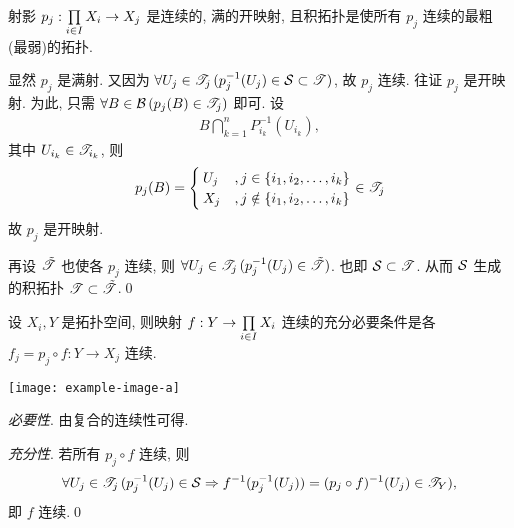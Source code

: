     \begin{Theorem}
        射影 $ p_{j}:\Prod{i\in I}{}X_{i}\to X_{j} $ 是连续的, 满的开映射, 且积拓扑是使所有 $ p_{j} $ 连续的最粗(最弱)的拓扑.
    \end{Theorem}
    \begin{Proof}
        显然 $ p_{j} $ 是满射. 又因为 $ \forall U_{j}\in\ST_{j}\,(p_{j}^{-1}(U_{j})\in\CS\subset\ST) $, 故 $ p_{j} $ 连续. 往证 $ p_{j} $ 是开映射. 为此, 只需 $ \forall B\in\CB\,(p_{j}(B)\in\ST_{j}) $ 即可. 设
        \begin{align*}
            B\bigcap_{k=1}^{n}P_{i_{k}}^{-1}(U_{i_{k}}),
        \end{align*}
        其中 $ U_{i_{k}}\in\ST_{i_{k}} $, 则
        \begin{align*}
            p_{j}(B)=\begin{cases}
                U_{j} & , j\in\set{\seq[k]{i}}\\
                X_{j} & , j\notin\set{\seq[k]{i}}
            \end{cases}\in \ST_{j}
        \end{align*}
        故 $ p_{j} $ 是开映射.

        再设 $ \tilde{\ST} $ 也使各 $ p_{j} $ 连续, 则 $ \forall U_{j}\in\ST_{j}\,(p_{j}^{-1}(U_{j})\in\tilde{\ST}) $. 也即 $ \CS\subset\ST $. 从而 $ \CS $ 生成的积拓扑 $ \ST\subset\tilde{\ST} $.\qed
    \end{Proof}
    
    \begin{Theorem}[连续映射的投影刻画]
        设 $ X_{i}, Y $ 是拓扑空间, 则映射 $ f: Y\to \Prod{i\in I}{}X_{i} $ 连续的充分必要条件是各 $ f_{j}=p_{j}\circ f: Y\to X_{j} $ 连续.
        \begin{center}
            \texttt{[image: example-image-a]}
        \end{center}
    \end{Theorem}
    \begin{Proof}
        \textsl{必要性}. 由复合的连续性可得.

        \textsl{充分性}. 若所有 $ p_{j}\circ f $ 连续, 则
        \begin{align*}
            \forall U_{j}\in\ST_{j}\,(p_{j}^{-1}(U_{j})\in\CS\Rightarrow f^{-1}(p_{j}^{-1}(U_{j}))=(p_{j}\circ f)^{-1}(U_{j})\in\ST_{Y}),
        \end{align*}
        即 $ f $ 连续.\qed
    \end{Proof}